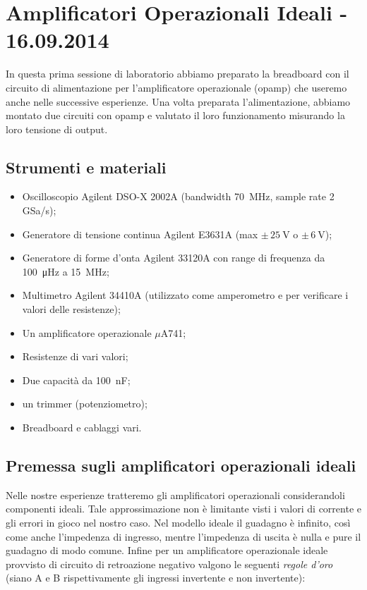 \section{Amplificatori Operazionali Ideali - 16.09.2014}

In questa prima sessione di laboratorio abbiamo preparato la breadboard con il circuito di alimentazione per l'amplificatore operazionale (opamp) che useremo anche nelle successive esperienze.
Una volta preparata l'alimentazione, abbiamo montato due circuiti con opamp e valutato il loro funzionamento misurando la loro tensione di output.

\subsection{Strumenti e materiali}

\begin{itemize} [noitemsep]
\item Oscilloscopio Agilent DSO-X 2002A (bandwidth \SI{70}{\mega\hertz}, sample rate \num{2} GSa/s);
\item Generatore di tensione continua Agilent E3631A (max $\pm \, \SI{25}{\volt}$ o $\pm \, \SI{6}{\volt}$);
\item Generatore di forme d'onta Agilent 33120A con range di frequenza da \SI{100}{\micro\hertz} a \SI{15}{\mega\hertz};
\item Multimetro Agilent 34410A (utilizzato come amperometro e per verificare i valori delle resistenze);
\item Un amplificatore operazionale $\mu$A741;
\item Resistenze di vari valori;
\item Due capacità da \SI{100}{\nano\farad};
\item un trimmer (potenziometro);
\item Breadboard e cablaggi vari.
\end{itemize}

\subsection{Premessa sugli amplificatori operazionali ideali}

Nelle nostre esperienze tratteremo gli amplificatori operazionali considerandoli componenti ideali. Tale approssimazione non è limitante visti i valori di corrente e gli errori in gioco nel nostro caso.
Nel modello ideale il guadagno è infinito, così come anche l'impedenza di ingresso, mentre l'impedenza di uscita è nulla e pure il guadagno di modo comune.
Infine per un amplificatore operazionale ideale provvisto di circuito di retroazione negativo valgono le seguenti \textit{regole d'oro} (siano A e B rispettivamente gli ingressi invertente e non invertente):

